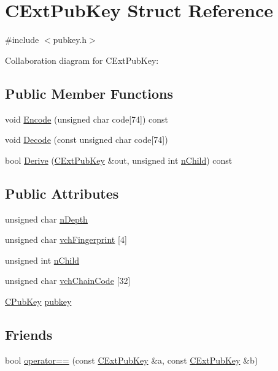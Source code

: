 \hypertarget{struct_c_ext_pub_key}{}\section{C\+Ext\+Pub\+Key Struct Reference}
\label{struct_c_ext_pub_key}


{\ttfamily \#include $<$pubkey.\+h$>$}



Collaboration diagram for C\+Ext\+Pub\+Key\+:
\subsection*{Public Member Functions}
\begin{DoxyCompactItemize}
\item 
void \hyperlink{struct_c_ext_pub_key_af197553c91c690fc436421fe00d55f8e}{Encode} (unsigned char code\mbox{[}74\mbox{]}) const 
\item 
void \hyperlink{struct_c_ext_pub_key_aa3ca44410ecfa765962d3b97aef61ab5}{Decode} (const unsigned char code\mbox{[}74\mbox{]})
\item 
bool \hyperlink{struct_c_ext_pub_key_a404798f7d800ffb539cf97431025597f}{Derive} (\hyperlink{struct_c_ext_pub_key}{C\+Ext\+Pub\+Key} \&out, unsigned int \hyperlink{struct_c_ext_pub_key_af816bc2798e9d9aaa94f56af4775d9bf}{n\+Child}) const 
\end{DoxyCompactItemize}
\subsection*{Public Attributes}
\begin{DoxyCompactItemize}
\item 
unsigned char \hyperlink{struct_c_ext_pub_key_a58a0724855654eab688cdb00738e3dba}{n\+Depth}
\item 
unsigned char \hyperlink{struct_c_ext_pub_key_a57101a84d16d7897bcec224e488143d9}{vch\+Fingerprint} \mbox{[}4\mbox{]}
\item 
unsigned int \hyperlink{struct_c_ext_pub_key_af816bc2798e9d9aaa94f56af4775d9bf}{n\+Child}
\item 
unsigned char \hyperlink{struct_c_ext_pub_key_a208836888dcc295ca1510de459ca1fc7}{vch\+Chain\+Code} \mbox{[}32\mbox{]}
\item 
\hyperlink{class_c_pub_key}{C\+Pub\+Key} \hyperlink{struct_c_ext_pub_key_ab18c8520919d20bbfd068565ae566ea8}{pubkey}
\end{DoxyCompactItemize}
\subsection*{Friends}
\begin{DoxyCompactItemize}
\item 
bool \hyperlink{struct_c_ext_pub_key_a21fdc5351d6df62ce501f57bc1e1c9e6}{operator==} (const \hyperlink{struct_c_ext_pub_key}{C\+Ext\+Pub\+Key} \&a, const \hyperlink{struct_c_ext_pub_key}{C\+Ext\+Pub\+Key} \&b)
\end{DoxyCompactItemize}


